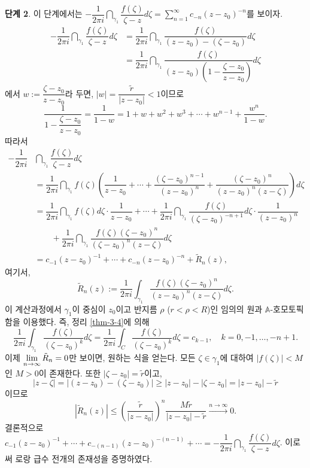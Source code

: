{\bf 단계 2}. 이 단계에서는
$ - \dfrac1{2\pi i } \dint_{\gamma_1} \dfrac{f(\zeta)}{\zeta-z}d\zeta
= \sum_{n=1}^\infty c_{-n}(z-z_0)^{-n}$를 보이자.
\begin{align*}
-\dfrac1{2\pi i } \dint_{\gamma_1} \dfrac{f(\zeta)}{\zeta-z}d\zeta
&= \dfrac1{2\pi i } \dint_{\gamma_1} \dfrac{f(\zeta)}{(z-z_0) - (\zeta-z_0)}d\zeta \\
&= \dfrac1{2\pi i } \dint_{\gamma_1} \dfrac{f(\zeta)}{(z-z_0)
\left(1 - \dfrac{\zeta-z_0}{z-z_0}\right)}d\zeta
\end{align*}
에서 $w:= \dfrac{\zeta-z_0}{z-z_0}$라 두면,
$|w| = \dfrac{\tilde r}{|z-z_0|} <1$이므로
\[
\dfrac1{1 - \dfrac{\zeta-z_0}{z-z_0}}
= \dfrac1{1-w} = 1+ w + w^2 + w^3 + \cdots + w^{n-1} + \dfrac{w^n}{1-w}.
\]
따라서
\begin{align*}
-\dfrac1{2\pi i } & \dint_{\gamma_1} \dfrac{f(\zeta)}{\zeta-z}d\zeta \\
& = \dfrac1{2\pi i } \dint_{\gamma_1} f(\zeta) \left(
\dfrac1{z-z_0} + \cdots + \dfrac{(\zeta-z_0)^{n-1}}{(z-z_0)^n}
+ \dfrac{(\zeta - z_0)^n}{(z-z_0)^n(z-\zeta)} \right) d\zeta \\
&=\dfrac1{2\pi i }  \dint_{\gamma_1} f(\zeta)d\zeta \cdot \dfrac1{z-z_0} 
+ \cdots + \dfrac1{2\pi i } \dint_{\gamma_1} \dfrac{f(\zeta)}{(\zeta-z_0)^{-n+1}} d\zeta
\cdot\dfrac1{(z-z_0)^n} \\
&\quad \quad + \dfrac1{2\pi i } \dint_{\gamma_1} 
\dfrac{f(\zeta)(\zeta-z_0)^n}{(\zeta-z_0)^n(z-\zeta)} d\zeta \\
& = c_{-1}(z-z_0)^{-1} + \cdots + c_{-n}(z-z_0)^{-n} + \tilde R_n(z),
\end{align*}
여기서, 
\[
\tilde R_n(z) := \dfrac1{2\pi i} \int_{\gamma_1} \dfrac{f(\zeta)(\zeta-z_0)^n}{(z-z_0)^n(z-\zeta)} d\zeta.
\]
이 계산과정에서 $\gamma_1$이 중심이 $z_0$이고 반지름 $\rho$ ($r<\rho<R$)인
임의의 원과 $\mathbb A$-호모토픽함을 이용했다.
즉, 정리 \ref{thm-3-4}에 의해
\[
\dfrac1{2\pi i} \int_{\gamma_1} \dfrac{f(\zeta)}{(\zeta-z_0)^k} d\zeta
= \dfrac1{2\pi i} \int_{C} \dfrac{f(\zeta)}{(\zeta-z_0)^k} d\zeta
= c_{k-1},
\quad k=0,-1,\ldots, -n+1.
\]
이제 
$\lim\limits_{n\to\infty} \tilde R_n = 0$만 보이면,
원하는 식을 얻는다.
모든 $\zeta \in \gamma_1$에 대하여 $|f(\zeta)| <M$인 $M>0$이 존재한다.
또한 $|\zeta - z_0| = \tilde r$이고,
\[
|z-\zeta| = |(z-z_0) -(\zeta - z_0) | \ge
|z- z_0| - |\zeta-z_0| =  |z-z_0| - \tilde r
\]
이므로 
\[
|\tilde R_n(z)| \le \left( \dfrac{\tilde r}{|z-z_0|} \right)^n
\dfrac{M \tilde r}{|z-z_0| - \tilde r} 
\xrightarrow{n\to\infty} 0.
\]
결론적으로 
$c_{-1}(z-z_0)^{-1} +\cdots + c_{-(n-1)} (z-z_0)^{-(n-1)} + \cdots
= - \dfrac1{2\pi i } \dint_{\gamma_1} \dfrac{f(\zeta)}{\zeta-z}d\zeta$.
이로써 로랑 급수 전개의 존재성을 증명하였다.

